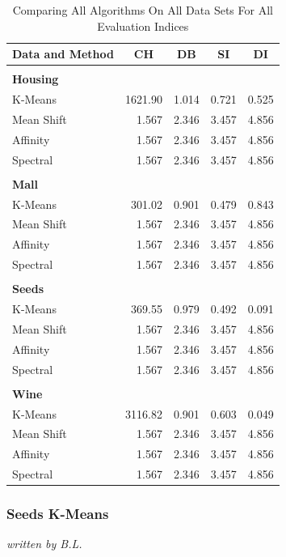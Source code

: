 \begin{table}[H]
\begin{center}
\begin{tabular}{lrrrr}
Data and Method & \multicolumn{1}{c}{\gls{CH}} & \multicolumn{1}{c}{\gls{DB}} & \multicolumn{1}{c}{\gls{SI}} & \multicolumn{1}{c}{\gls{DI}} \\ \hline
 &  &  &  &  \\
\textbf{Housing} &  &  &  & \\
K-Means & 1621.90 & 1.014 & 0.721 & 0.525 \\
Mean Shift & 1.567 & 2.346 & 3.457 & 4.856 \\
Affinity & 1.567 & 2.346 & 3.457 & 4.856 \\
Spectral & 1.567 & 2.346 & 3.457 & 4.856 \\
 &  &  &  &  \\
\textbf{Mall} &  &  &  &  \\
K-Means & 301.02 & 0.901 & 0.479 & 0.843 \\
Mean Shift & 1.567 & 2.346 & 3.457 & 4.856 \\
Affinity & 1.567 & 2.346 & 3.457 & 4.856 \\
Spectral & 1.567 & 2.346 & 3.457 & 4.856 \\
 &  &  &  &  \\
\textbf{Seeds} &  &  &  &  \\
K-Means & 369.55 & 0.979 & 0.492 & 0.091 \\
Mean Shift & 1.567 & 2.346 & 3.457 & 4.856 \\
Affinity & 1.567 & 2.346 & 3.457 & 4.856 \\
Spectral & 1.567 & 2.346 & 3.457 & 4.856 \\
 &  &  &  &  \\
\textbf{Wine} &  &  &  &  \\
K-Means & 3116.82 & 0.901 & 0.603 & 0.049 \\
Mean Shift & 1.567 & 2.346 & 3.457 & 4.856 \\
Affinity & 1.567 & 2.346 & 3.457 & 4.856 \\
Spectral & 1.567 & 2.346 & 3.457 & 4.856
\end{tabular}%
\end{center}
\caption{Comparing All Algorithms On All Data Sets For All Evaluation Indices}
\label{tab:evalutaion_table}
\end{table}


\subsubsection{Seeds K-Means}
\textit{written by B.L.}\\

